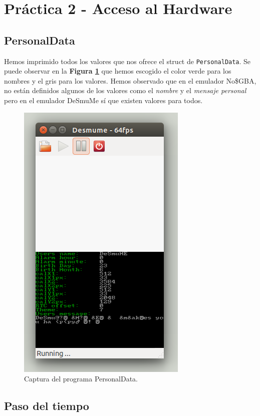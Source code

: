 
\section{Práctica 2 - Acceso al Hardware}

\subsection{PersonalData}

Hemos imprimido todos los valores que nos ofrece el struct de {\tt PersonalData}. Se puede observar en la \textbf{Figura \ref{s1}} que hemos escogido el color verde para los nombres y el gris para los valores. Hemos observado que en el emulador No\$GBA, no están definidos algunos de los valores como el \emph{nombre} y el \emph{mensaje personal} pero en el emulador DeSmuMe sí que existen valores para todos.

\begin{figure}[H] 
\centering
\includegraphics[scale=0.75]{P2Media/personaldata.png}
\caption{Captura del programa PersonalData.}
\label{s1}
\end{figure}
  
\newpage
  
\subsection{Paso del tiempo}

